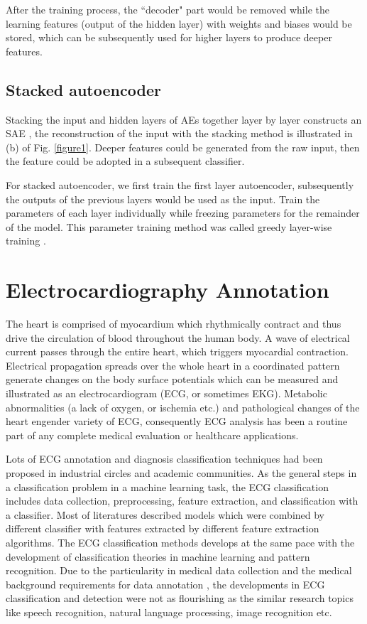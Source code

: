 \documentclass[journal]{IEEEtran}
\begin{document}
After the training process, the ``decoder" part would be removed while the learning features (output of the hidden layer) with weights and biases would be stored, which can be subsequently used for higher layers to produce deeper features.

\subsection{Stacked autoencoder}
Stacking the input and hidden layers of AEs together layer by layer constructs an SAE \cite{chen2014deep}, the reconstruction of the input with the stacking method is illustrated in (b) of Fig. \ref{figure1}. Deeper features could be generated from the raw input, then the feature could be adopted in a subsequent classifier. 

For stacked autoencoder, we first train the first layer autoencoder, subsequently the outputs of the previous layers would be used as the input. Train the parameters of each layer individually while freezing parameters for the remainder of the model. This parameter training method was called greedy layer-wise training \cite{bengio2007greedy}.

\section{Electrocardiography Annotation}
The heart is comprised of myocardium which rhythmically contract and thus drive the circulation of blood throughout the human body. A wave of electrical current passes through the entire heart, which triggers myocardial contraction\cite{clifford}. Electrical propagation spreads over the whole heart in a coordinated pattern generate changes on the body surface potentials which can be measured and illustrated as an electrocardiogram (ECG, or sometimes EKG). Metabolic abnormalities (a lack of oxygen, or ischemia etc.) and pathological changes of the heart engender variety of ECG, consequently ECG analysis has been a routine part of any complete medical evaluation or healthcare applications. 

Lots of ECG annotation and diagnosis classification techniques had been proposed in industrial circles and academic communities. As the general steps in a classification problem in a machine learning task, the ECG classification includes data collection, preprocessing, feature extraction, and classification with a classifier. Most of literatures described models which were combined by different classifier with features extracted by different feature extraction algorithms. The ECG classification methods develops at the same pace with the development of classification theories in machine learning and pattern recognition. Due to the particularity in medical data collection and the medical background requirements for data annotation , the developments in ECG classification and detection were not as flourishing as the similar research topics like speech recognition, natural language processing, image recognition etc.
\end{document}

